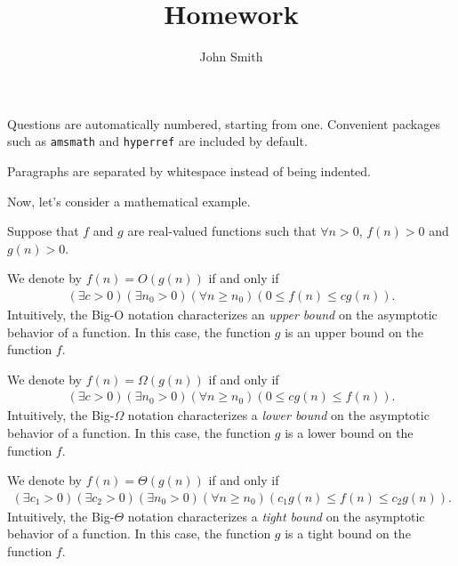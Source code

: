 \documentclass{homework}
\title{Homework}
\author{John Smith}
\begin{document}
\maketitle

\question
Questions are automatically numbered, starting from one. Convenient packages such as \texttt{amsmath} and \texttt{hyperref} are included by default.

Paragraphs are separated by whitespace instead of being indented.

\question
Now, let's consider a mathematical example.

Suppose that $f$ and $g$ are real-valued functions such that $\forall n > 0$, $f(n) > 0$ and $g(n) > 0$.

\begin{definition}[Big-O]
    We denote by $f(n) = O(g(n))$ if and only if
    \begin{align*}
        (\exists c > 0) (\exists n_0 > 0) (\forall n \geq n_0) (0 \leq f(n) \leq c g(n)).
    \end{align*}
    Intuitively, the Big-O notation characterizes an \textit{upper bound} on the asymptotic behavior of a function. In this case, the function $g$ is an upper bound on the function $f$.
\end{definition}

\begin{definition}
    We denote by $f(n) = \Omega(g(n))$ if and only if
    \begin{align*}
        (\exists c > 0) (\exists n_0 > 0) (\forall n \geq n_0) (0 \leq c g(n) \leq f(n)).
    \end{align*}
    Intuitively, the Big-$\Omega$ notation characterizes a \textit{lower bound} on the asymptotic behavior of a function. In this case, the function $g$ is a lower bound on the function $f$.
\end{definition}

\begin{definition}
    We denote by $f(n) = \Theta(g(n))$ if and only if
    \begin{align*}
        (\exists c_1 > 0) (\exists c_2 > 0) (\exists n_0 > 0) (\forall n \geq n_0) (c_1 g(n) \leq f(n) \leq c_2 g(n)).
    \end{align*}
    Intuitively, the Big-$\Theta$ notation characterizes a \textit{tight bound} on the asymptotic behavior of a function. In this case, the function $g$ is a tight bound on the function $f$.
\end{definition}
\end{document}

